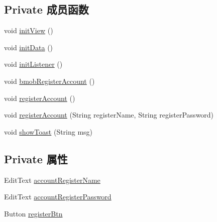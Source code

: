 \subsection*{Private 成员函数}
\begin{DoxyCompactItemize}
\item 
void \mbox{\hyperlink{classcom_1_1example_1_1akisame__lin_1_1love__air2_1_1_register_activity_a0870becf282f8bb4e1d306a5934eb300}{init\+View}} ()
\item 
void \mbox{\hyperlink{classcom_1_1example_1_1akisame__lin_1_1love__air2_1_1_register_activity_a311b9edaf0c38664691fa6e3a319108a}{init\+Data}} ()
\item 
void \mbox{\hyperlink{classcom_1_1example_1_1akisame__lin_1_1love__air2_1_1_register_activity_a8300ac0841b06dc673de976512392667}{init\+Listener}} ()
\item 
void \mbox{\hyperlink{classcom_1_1example_1_1akisame__lin_1_1love__air2_1_1_register_activity_a9f1b8e4fc412eb167ece988a424a4a22}{bmob\+Register\+Account}} ()
\item 
void \mbox{\hyperlink{classcom_1_1example_1_1akisame__lin_1_1love__air2_1_1_register_activity_aede28a58e2426c0b1503e03084aa80d6}{register\+Account}} ()
\item 
void \mbox{\hyperlink{classcom_1_1example_1_1akisame__lin_1_1love__air2_1_1_register_activity_a3328323ac95ce0d9c3f5005dd40dabe4}{register\+Account}} (String register\+Name, String register\+Password)
\item 
void \mbox{\hyperlink{classcom_1_1example_1_1akisame__lin_1_1love__air2_1_1_register_activity_aef9d8c99d05df8a717b02331d82385b2}{show\+Toast}} (String msg)
\end{DoxyCompactItemize}
\subsection*{Private 属性}
\begin{DoxyCompactItemize}
\item 
Edit\+Text \mbox{\hyperlink{classcom_1_1example_1_1akisame__lin_1_1love__air2_1_1_register_activity_a5f130b2d2ce37b19275c343df7cfb5e9}{account\+Register\+Name}}
\item 
Edit\+Text \mbox{\hyperlink{classcom_1_1example_1_1akisame__lin_1_1love__air2_1_1_register_activity_a877f36874c02a5f283b33b3d841ce852}{account\+Register\+Password}}
\item 
Button \mbox{\hyperlink{classcom_1_1example_1_1akisame__lin_1_1love__air2_1_1_register_activity_a56de9015cc9329a9d852f3fb8ae22540}{register\+Btn}}
\end{DoxyCompactItemize}


